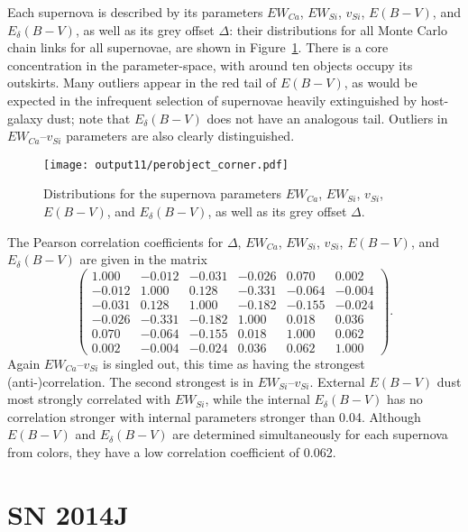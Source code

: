 \documentclass{aastex}   	%
\begin{document}
Each supernova is described by its parameters $EW_{Ca}$, $EW_{Si}$, $v_{Si}$, $E(B-V)$, and $E_\delta(B-V)$, as well as its grey offset
$\Delta$: their distributions for all Monte Carlo chain links for all supernovae, are shown in Figure~\ref{perobject:fig}.
There is a core concentration in the  parameter-space, with around ten objects occupy its outskirts.
Many outliers appear in the red tail of $E(B-V)$, as would be expected in the infrequent selection of supernovae
heavily extinguished by host-galaxy dust; note that $E_\delta(B-V)$ does not have an analogous tail.
Outliers in  $EW_{Ca}$--$v_{Si}$ parameters are also clearly distinguished.

\begin{figure}[htbp] %
   \centering
   \texttt{[image: output11/perobject\_corner.pdf]} 
   \caption{Distributions for the supernova parameters $EW_{Ca}$, $EW_{Si}$, $v_{Si}$, $E(B-V)$, and $E_\delta(B-V)$, as well as its grey offset
$\Delta$.
   \label{perobject:fig}}
\end{figure}

The Pearson correlation coefficients for $\Delta$, $EW_{Ca}$, $EW_{Si}$, $v_{Si}$, $E(B-V)$, and $E_\delta(B-V)$ are given in the matrix
\begin{equation}
\begin{pmatrix}
1.000 & -0.012 & -0.031 & -0.026 & 0.070 & 0.002 \\
-0.012 & 1.000 & 0.128 & -0.331 & -0.064 & -0.004 \\
-0.031 & 0.128 & 1.000 & -0.182 & -0.155 & -0.024 \\
-0.026 & -0.331 & -0.182 & 1.000 & 0.018 & 0.036 \\
0.070 & -0.064 & -0.155 & 0.018 & 1.000 & 0.062 \\
0.002 & -0.004 & -0.024 & 0.036 & 0.062 & 1.000
\end{pmatrix}.
\end{equation}
Again  $EW_{Ca}$--$v_{Si}$ is singled out, this time as having the strongest (anti-)correlation.  The second strongest is in
$EW_{Si}$--$v_{Si}$.
External $E(B-V)$ dust most strongly correlated with $EW_{Si}$, while the internal $E_\delta(B-V)$  has no correlation stronger with internal parameters stronger than
0.04.  Although $E(B-V)$ and $E_\delta(B-V)$ are determined simultaneously for each supernova from colors, they have a low correlation coefficient of 0.062.

\section{SN 2014J}
\label{sn2014j:sec}
\end{document}
